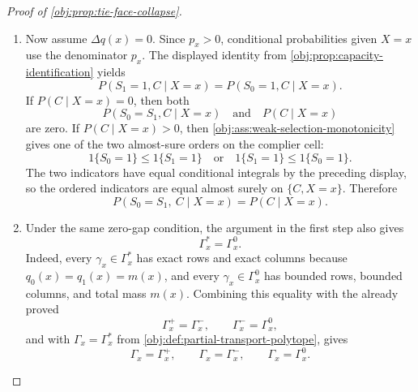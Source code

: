 \documentclass[11pt]{article}
\begin{document}
\begin{proof}[Proof of \cref{obj:prop:tie-face-collapse}]
\begin{enumerate}
Conversely, suppose \(\Delta q(x)=0\). Then
\[
q_0(x)=q_1(x)=m(x).
\]
If \(\gamma_x\in\Gamma_x^{+}\), then its exact row constraints give
\[
\operatorname{tot}(\gamma_x)
=
\sum_i\operatorname{row}_i(\gamma_x)
=
\sum_i\ell_i(x)
=
q_0(x)
=
m(x),
\]
so \(\gamma_x\in\Gamma_x^\ast\). Since \(q_1(x)\le q_0(x)\), the column-exactness argument above gives
\[
\operatorname{col}_j(\gamma_x)=h_j(x)\qquad\text{for every }j,
\]
and hence \(\gamma_x\in\Gamma_x^{-}\). The reverse inclusion follows symmetrically from exact columns and row-exactness. Therefore
\[
\Gamma_x^{+}=\Gamma_x^{-}.
\]
The same reasoning sends every element of \(\Gamma_x^{-}\) to \(\Gamma_x^0\), while \(\Gamma_x^0\subseteq\Gamma_x^{-}\) is immediate from the defining constraints. Hence
\[
\Gamma_x^{-}=\Gamma_x^0.
\]
This proves
\[
\bigl(\Gamma_x^{+}=\Gamma_x^{-}\ \text{and}\ \Gamma_x^{-}=\Gamma_x^{0}\bigr)
\Longleftrightarrow
\Delta q(x)=0.
\]

\item Now assume \(\Delta q(x)=0\). Since \(p_x>0\), conditional probabilities given \(X=x\) use the denominator \(p_x\). The displayed identity from \cref{obj:prop:capacity-identification} yields
\[
P(S_1=1,C\mid X=x)=P(S_0=1,C\mid X=x).
\]
If \(P(C\mid X=x)=0\), then both
\[
P(S_0=S_1,C\mid X=x)
\quad\text{and}\quad
P(C\mid X=x)
\]
are zero. If \(P(C\mid X=x)>0\), then \cref{obj:ass:weak-selection-monotonicity} gives one of the two almost-sure orders on the complier cell:
\[
1\{S_0=1\}\le 1\{S_1=1\}
\quad\text{or}\quad
1\{S_1=1\}\le 1\{S_0=1\}.
\]
The two indicators have equal conditional integrals by the preceding display, so the ordered indicators are equal almost surely on \(\{C,X=x\}\). Therefore
\[
P(S_0=S_1,\ C\mid X=x)=P(C\mid X=x).
\]

\item Under the same zero-gap condition, the argument in the first step also gives
\[
\Gamma_x^\ast=\Gamma_x^0.
\]
Indeed, every \(\gamma_x\in\Gamma_x^\ast\) has exact rows and exact columns because
\(q_0(x)=q_1(x)=m(x)\), and every \(\gamma_x\in\Gamma_x^0\) has bounded rows, bounded columns, and total mass \(m(x)\). Combining this equality with the already proved
\[
\Gamma_x^+=\Gamma_x^-,
\qquad
\Gamma_x^-=\Gamma_x^0,
\]
and with \(\Gamma_x=\Gamma_x^\ast\) from \cref{obj:def:partial-transport-polytope}, gives
\[
\Gamma_x=\Gamma_x^{+},
\qquad
\Gamma_x=\Gamma_x^{-},
\qquad
\Gamma_x=\Gamma_x^{0}.
\]


\end{enumerate}
\end{proof}
\end{document}
